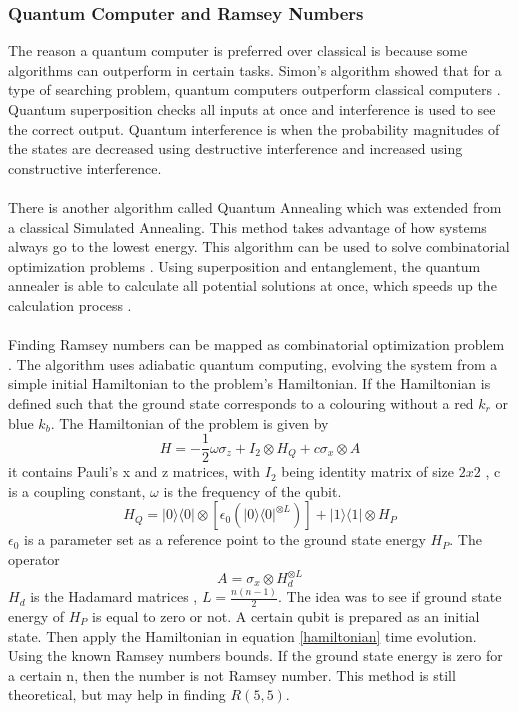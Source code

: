 \documentclass{Assignment}
\begin{document}
\subsubsection{Quantum Computer and Ramsey Numbers}
The reason a quantum computer is preferred over classical is because some algorithms can outperform in certain tasks. 
Simon's algorithm showed that for a type of searching problem, quantum computers outperform classical computers \cite{doi:10.1137/S0097539796298637}.
Quantum superposition checks all inputs at once and interference is used to see the correct output.
Quantum interference is when the probability magnitudes of the states are decreased using destructive interference and increased using constructive interference.
\\\\
There is another algorithm called Quantum Annealing which was extended from a classical Simulated Annealing.
This method takes advantage of how systems always go to the lowest energy.
This algorithm can be used to solve combinatorial optimization problems \cite{AndrewSteane}.
Using superposition and entanglement, the quantum annealer is able to calculate all potential solutions at once, which speeds up the 
calculation process \cite{AndrewSteane}.
\\\\
Finding Ramsey numbers can be mapped as combinatorial optimization problem \cite{PhysRevA.93.032301}.
The algorithm uses adiabatic quantum computing, evolving the system from a simple initial Hamiltonian to the problem's Hamiltonian.
If the Hamiltonian is defined such that the ground state corresponds to a colouring without a red $k_r$ or blue $k_b$.
The Hamiltonian of the problem is given by
\begin{equation}
	H = -\frac{1}{2}\omega \sigma_z + I_2 \otimes H_Q+c\sigma_x\otimes A
	\label{hamiltonian}
\end{equation}
it contains Pauli's x and z matrices, with $I_2$ being identity matrix of size $2 x 2$ , c is a coupling constant, $\omega$ is the frequency of the qubit.
$$H_Q =|0\rangle\langle0|\otimes[\epsilon_0(|0\rangle\langle0|^{\otimes L})] + |1\rangle\langle 1|\otimes H_P$$
$\epsilon_0$ is a parameter set as a reference point to the ground state energy $H_P$.
The operator $$A = \sigma_x \otimes H_d^{\otimes L}$$
$H_d$ is the Hadamard matrices , $L = \frac{n(n-1)}{2}$.
The idea was to see if ground state energy of $H_P$ is equal to zero or not.
A certain qubit is prepared as an initial state.
Then apply the Hamiltonian in equation \eqref{hamiltonian} time evolution. 
Using the known Ramsey numbers bounds.
If the ground state energy is zero for a certain n, then the number is not Ramsey number. 
This method is still theoretical, but may help in finding $R(5,5)$.
\end{document}
